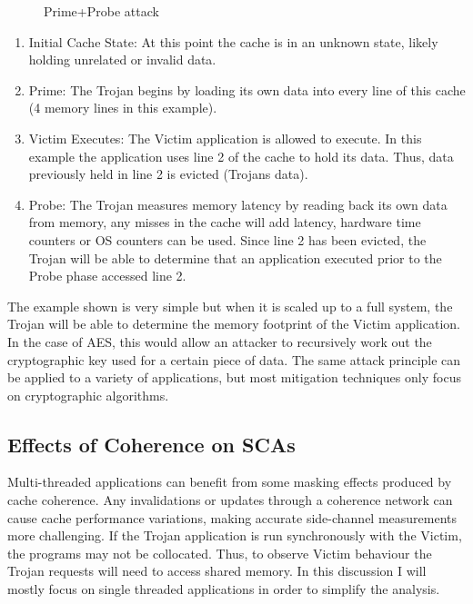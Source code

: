 		\begin{figure}[!h]
		\centering 
			\caption{Prime+Probe attack} 
			\label{prime_and_probe}
		\end{figure}
		
		\begin{enumerate}
			\item Initial Cache State: At this point the cache is in an unknown state, likely holding unrelated or invalid data.
			\item Prime: The Trojan begins by loading its own data into every line of this cache (4 memory lines in this example).
			\item Victim Executes: The Victim application is allowed to execute. In this example the application uses line 2 of the cache to hold its data. Thus, data previously held in line 2 is evicted (Trojans data).
			\item Probe: The Trojan measures memory latency by reading back its own data from memory, any misses in the cache will add latency, hardware time counters or OS counters can be used. Since line 2 has been evicted, the Trojan will be able to determine that an application executed prior to the Probe phase accessed line 2.
		\end{enumerate}
		
		The example shown is very simple but when it is scaled up to a full system, the Trojan will be able to determine the memory footprint of the Victim application. In the case of AES, this would allow an attacker to recursively work out the cryptographic key used for a certain piece of data. The same attack principle can be applied to a variety of applications, but most mitigation techniques only focus on cryptographic algorithms.

	\subsection{Effects of Coherence on SCAs}
		Multi-threaded applications can benefit from some masking effects produced by cache coherence. Any invalidations or updates through a coherence network can cause cache performance variations, making accurate side-channel measurements more challenging. If the Trojan application is run synchronously with the Victim, the programs may not be collocated. Thus, to observe Victim behaviour the Trojan requests will need to access shared memory. In this discussion I will mostly focus on single threaded applications in order to simplify the analysis. 
		
